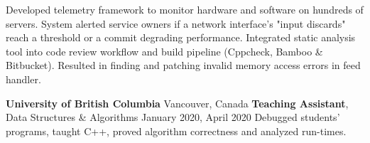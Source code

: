 {    \innerlist
    {
	    \entry
        {
            Developed telemetry framework to monitor hardware and software on hundreds of servers. System alerted service owners if a network interface's "input discards" reach a threshold or a commit degrading performance.
        }
	    \entry
	    {
            Integrated static analysis tool into code review workflow and build pipeline (Cppcheck, Bamboo \& Bitbucket). Resulted in finding and patching invalid memory access errors in feed handler.
        }
    }

    \entrybig
	{
        \textbf{University of British Columbia}
    }
    {
        Vancouver, Canada
    }
	{
        \textbf{Teaching Assistant}, Data Structures \& Algorithms
    }
    {
        January 2020, April 2020
    }
    \innerlist
    {
        \entry
        {
            Debugged students’ programs, taught C++, proved algorithm correctness and analyzed run-times.
        }
    }
}

